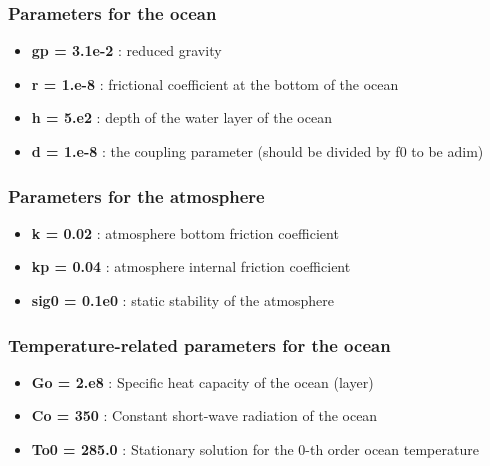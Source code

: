 \documentclass[letterpaper,10pt,english]{sphinxmanual}
\begin{document}
\subsubsection{Parameters for the ocean}
\label{rstfiles/params_maooam:parameters-for-the-ocean}\begin{itemize}
\item {} 
\textbf{gp = 3.1e-2}  : reduced gravity

\item {} 
\textbf{r = 1.e-8}  : frictional coefficient at the bottom of the ocean

\item {} 
\textbf{h = 5.e2}  : depth of the water layer of the ocean

\item {} 
\textbf{d = 1.e-8}  : the coupling parameter (should be divided by f0 to be adim)

\end{itemize}


\subsubsection{Parameters for the atmosphere}
\label{rstfiles/params_maooam:parameters-for-the-atmosphere}\begin{itemize}
\item {} 
\textbf{k = 0.02}  : atmosphere bottom friction coefficient

\item {} 
\textbf{kp = 0.04}  : atmosphere internal friction coefficient

\item {} 
\textbf{sig0 = 0.1e0}  : static stability of the atmosphere

\end{itemize}


\subsubsection{Temperature-related parameters for the ocean}
\label{rstfiles/params_maooam:temperature-related-parameters-for-the-ocean}\begin{itemize}
\item {} 
\textbf{Go = 2.e8}  : Specific heat capacity of the ocean (layer)

\item {} 
\textbf{Co = 350}  : Constant short-wave radiation of the ocean

\item {} 
\textbf{To0 = 285.0}  : Stationary solution for the 0-th order ocean temperature

\end{itemize}
\end{document}

